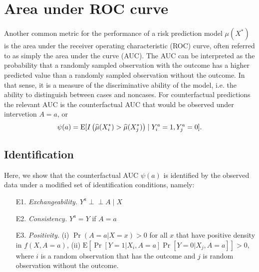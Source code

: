 \section{Area under ROC curve}\label{sec:auc}
Another common metric for the performance of a risk prediction model $\mu(X^*)$ is the area under the receiver operating characteristic (ROC) curve, often referred to as simply the area under the curve (AUC). The AUC can be interpreted as the probability that a randomly sampled observation with the outcome has a higher predicted value than a randomly sampled observation without the outcome. In that sense, it is a measure of the discriminative ability of the model, i.e. the ability to distinguish between cases and noncases. For counterfactual predictions the relevant AUC is the counterfactual AUC that would be observed under intervetion $A=a$, or
\begin{equation}\label{eqn:auc_estimand}
    \psi(a) = \operatorname{E}[I\left(\widehat{\mu}(X^*_i) > \widehat{\mu}(X^*_j)\right) \mid Y_i^a = 1, Y_j^a = 0].
\end{equation}

\subsection{Identification}
Here, we show that the counterfactual AUC $\psi(a)$ is identified by the observed data under a modified set of identification conditions, namely:
\begin{enumerate}
    \item[E1.] \textit{Exchangeability.} $Y^a \perp\!\!\!\perp A \mid X$ 
    \item[E2.] \textit{Consistency.} $Y^a = Y$ if $A = a$
    \item[E3.] \textit{Positivity.} (i) $\Pr(A = a | X = x) > 0$ for all $x$ that have positive density in $f(X, A = a)$, (ii) $\mathrm{E}\left[\Pr[Y = 1 | X_i, A = a]\Pr[Y = 0 | X_j, A = a]\right] > 0 $, where $i$ is a random observation that has the outcome and $j$ is random observation without the outcome.
\end{enumerate}


